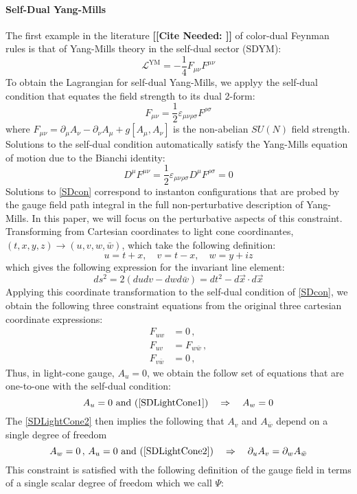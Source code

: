 \documentclass[11pt,letter]{article}
\def\be{\begin{equation}}
\def\ee{\end{equation}}
\newcommand{\citepls}[1]{{\bf\color{red}[[Cite Needed: #1]]}}
\begin{document}
\paragraph{Self-Dual Yang-Mills} The first example in the literature \citepls{} of color-dual Feynman rules is that of Yang-Mills theory in the self-dual sector (SDYM):
\be
\mathcal{L}^{\text{YM}} = -\frac{1}{4}F_{\mu\nu}F^{\mu\nu}
\ee
To obtain the Lagrangian for self-dual Yang-Mills, we applyy the self-dual condition that equates the field strength to its dual 2-form:
\be\label{SDcon}
F_{\mu\nu} = \frac{1}{2} \varepsilon_{\mu\nu\rho\sigma}F^{\rho\sigma}
\ee
where $F_{\mu\nu} = \partial_\mu A_\nu -\partial_\nu A_\mu + g[A_\mu ,A_\nu]$ is the non-abelian $SU(N)$ field strength. Solutions to the self-dual condition automatically satisfy the Yang-Mills equation of motion due to the Bianchi identity:
\be
D^\mu F^{\mu\nu} = \frac{1}{2} \varepsilon_{\mu\nu\rho\sigma}D^\mu F^{\rho\sigma} = 0
\ee
Solutions to \cref{SDcon} correspond to instanton configurations that are probed by the gauge field path integral in the full non-perturbative description of Yang-Mills. In this paper, we will focus on the perturbative aspects of this constraint. Transforming from Cartesian coordinates to light cone coordinantes, $(t,x,y,z) \rightarrow (u,v,w,\bar{w})$, which take the following definition:
\be
u = t+x,\quad v=t-x, \quad w = y+iz
\ee
which gives the following expression for the invariant line element:
\be
ds^2 = 2(dudv - dwd\bar{w}) = dt^2 - d\vec{x}\cdot d\vec{x}
\ee
Applying this coordinate transformation to the self-dual condition of \cref{SDcon}, we obtain the following three constraint equations from the original three cartesian coordinate expressions:
\begin{align} \label{SDLightCone1}
F_{uw} &=0\,,
\\
 \label{SDLightCone2}
 F_{uv} &= F_{w\bar{w}}\,,
\\
 \label{SDLightCone3}
 F_{v\bar{w}} &= 0\,,
\end{align}
Thus, in light-cone gauge, $A_u=0$, we obtain the follow set of equations that are one-to-one with the self-dual condition:
\be
A_u=0 \text{ and } (\ref{SDLightCone1}) \quad\Rightarrow \quad A_w=0
\ee
The \cref{SDLightCone2} then implies the following that $A_v$ and $A_{\bar{w}}$ depend on a single degree of freedom
\be
A_w=0\,,\,A_u=0 \text{ and } (\ref{SDLightCone2}) \quad\Rightarrow \quad \partial_u A_v = \partial_w A_{\bar{w}}
\ee
This constraint is  satisfied with the following definition of the gauge field in terms of a single scalar degree of freedom which we call $\Psi$:
\end{document}
